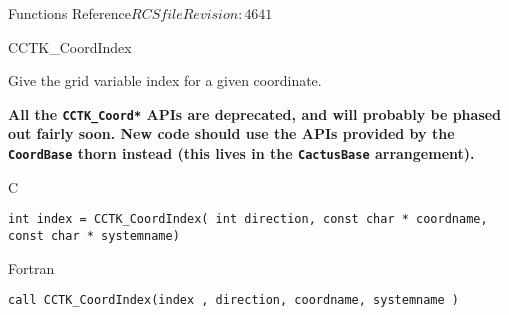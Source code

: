 \begin{cactuspart}{ Functions Reference}{$RCSfile$}{$Revision: 4641 $}

\begin{FunctionDescription}{CCTK\_CoordIndex}%
{Give the grid variable index for a given coordinate.

\textbf{All the \texttt{CCTK\_Coord*} APIs are deprecated,
and will probably be phased out fairly soon.
New code should use the APIs provided by the \texttt{CoordBase} thorn
instead (this lives in the \texttt{CactusBase} arrangement).}
}
\label{CCTK-CoordIndex}
\begin{SynopsisSection}
\begin{Synopsis}{C}
\begin{verbatim}int index = CCTK_CoordIndex( int direction, const char * coordname, const char * systemname)\end{verbatim}
\end{Synopsis}
\begin{Synopsis}{Fortran}
\begin{verbatim}call CCTK_CoordIndex(index , direction, coordname, systemname )


\end{verbatim}
\end{Synopsis}
\end{SynopsisSection}
\end{FunctionDescription}
\end{cactuspart}
